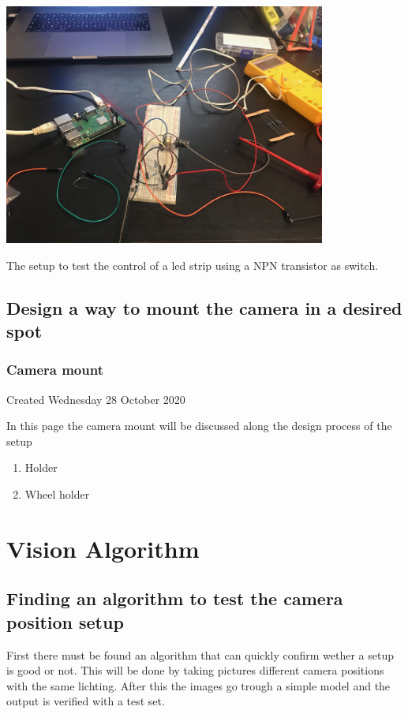 \includegraphics[height=3.125000in, keepaspectratio=true]{./fig/Camera_setup/Light/White_Led_Strips/Test_setup_ledstrip.jpeg}

The setup to test the control of a led strip using a NPN transistor as switch.

\subsection{Design a way to mount the camera in a desired spot}
		\subsubsection{Camera mount}

Created Wednesday 28 October 2020



In this page the camera mount will be discussed along the design process of the setup



\begin{enumerate}
\item Holder 
\item Wheel holder
\end{enumerate}

\section{Vision Algorithm}

\subsection{Finding an algorithm to test the camera position setup}

First there must be found an algorithm that can quickly confirm wether a setup is good or not. This will be done by taking pictures different camera positions with the same lichting. After this the images go trough a simple model and the output is verified with a test set. 

